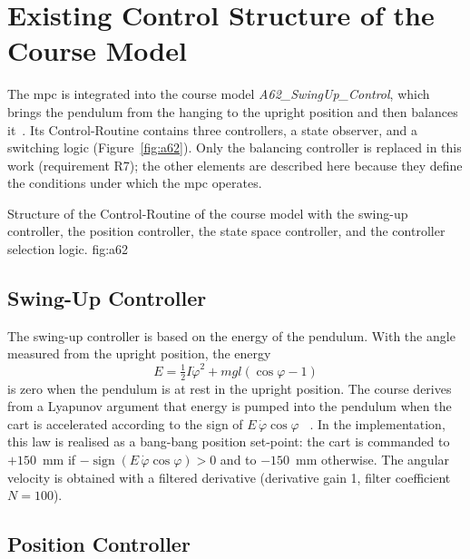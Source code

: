 \section{Existing Control Structure of the Course Model}
\label{sec:baseline}

The \ac{mpc} is integrated into the course model \emph{A62\_SwingUp\_Control},
which brings the pendulum from the hanging to the upright position and then
balances it~\cite{ln_manual}. Its Control-Routine contains three controllers,
a state observer, and a switching logic (Figure~\ref{fig:a62}). Only the
balancing controller is replaced in this work (requirement R7); the other
elements are described here because they define the conditions under which
the \ac{mpc} operates.

  {Structure of the Control-Routine of the course model with the swing-up controller, the position controller, the state space controller, and the controller selection logic.}
  {fig:a62}

\subsection{Swing-Up Controller}
\label{subsec:swingup}

The swing-up controller is based on the energy of the pendulum. With the angle
measured from the upright position, the energy
\begin{equation}
  E = \tfrac{1}{2}I\dot{\varphi}^2 + mgl\left(\cos\varphi - 1\right)
  \label{eq:energy}
\end{equation}
is zero when the pendulum is at rest in the upright position. The course
derives from a Lyapunov argument that energy is pumped into the pendulum when
the cart is accelerated according to the sign of $E\,\dot{\varphi}\cos\varphi$
~\cite{ln_manual}. In the implementation, this law is realised as a
bang-bang position set-point: the cart is commanded to $+150$~mm if
$-\operatorname{sign}(E\,\dot{\varphi}\cos\varphi) > 0$ and to $-150$~mm
otherwise. The angular velocity is obtained with a filtered derivative
(derivative gain 1, filter coefficient $N = 100$).

\subsection{Position Controller}
\label{subsec:poscontrol}

